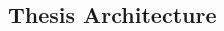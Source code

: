 \documentclass[12pt]{article}
\makeatletter
\renewcommand\paragraph{\@startsection{paragraph}{5}{\z@}%
  {3.25ex \@plus1ex \@minus.2ex}%
  {-1em}%
  {\normalfont\normalsize\bfseries}}
\makeatother
\begin{document}
\begin{CJK*}{UTF8}{bkai}
\begin{spacing}{1.77}




\subsection{Thesis Architecture}

\end{spacing}
\end{CJK*}
\end{document}
